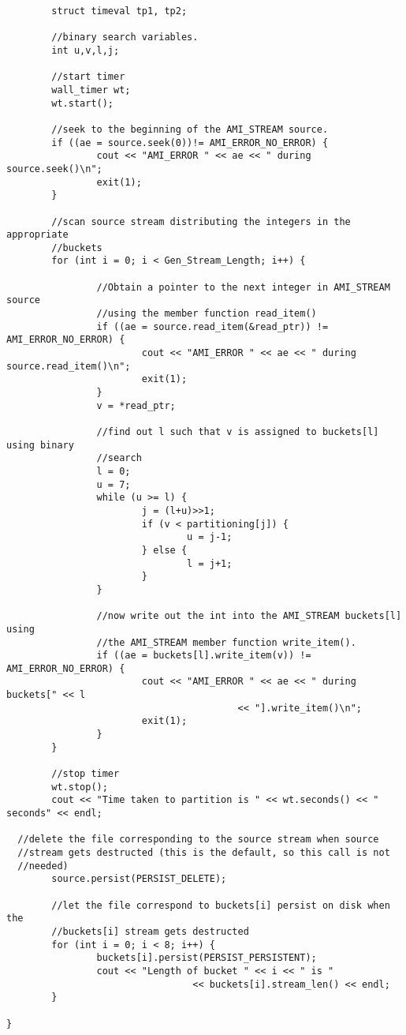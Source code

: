 \begin{verbatim}
        struct timeval tp1, tp2;

        //binary search variables.
        int u,v,l,j;
        
        //start timer
        wall_timer wt;
        wt.start();
        
        //seek to the beginning of the AMI_STREAM source.
        if ((ae = source.seek(0))!= AMI_ERROR_NO_ERROR) {
                cout << "AMI_ERROR " << ae << " during source.seek()\n";
                exit(1);
        }
        
        //scan source stream distributing the integers in the appropriate
        //buckets
        for (int i = 0; i < Gen_Stream_Length; i++) {
                
                //Obtain a pointer to the next integer in AMI_STREAM source
                //using the member function read_item()
                if ((ae = source.read_item(&read_ptr)) != AMI_ERROR_NO_ERROR) {
                        cout << "AMI_ERROR " << ae << " during source.read_item()\n";
                        exit(1);
                }
                v = *read_ptr;

                //find out l such that v is assigned to buckets[l] using binary
                //search
                l = 0;
                u = 7;
                while (u >= l) {
                        j = (l+u)>>1; 
                        if (v < partitioning[j]) {
                                u = j-1;
                        } else {
                                l = j+1;
                        }
                }

                //now write out the int into the AMI_STREAM buckets[l] using 
                //the AMI_STREAM member function write_item().
                if ((ae = buckets[l].write_item(v)) != AMI_ERROR_NO_ERROR) {
                        cout << "AMI_ERROR " << ae << " during buckets[" << l 
                                         << "].write_item()\n";
                        exit(1);
                }
        }
        
        //stop timer
        wt.stop();
        cout << "Time taken to partition is " << wt.seconds() << " seconds" << endl;
        
  //delete the file corresponding to the source stream when source
  //stream gets destructed (this is the default, so this call is not
  //needed)
        source.persist(PERSIST_DELETE);
        
        //let the file correspond to buckets[i] persist on disk when the
        //buckets[i] stream gets destructed
        for (int i = 0; i < 8; i++) {
                buckets[i].persist(PERSIST_PERSISTENT);
                cout << "Length of bucket " << i << " is " 
                                 << buckets[i].stream_len() << endl;
        }
        
}

\end{verbatim}


